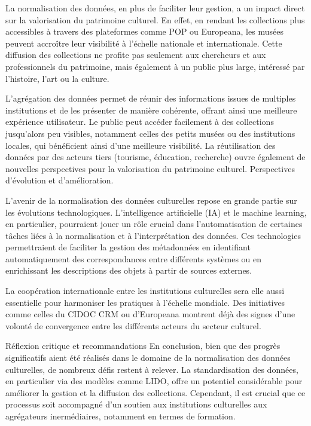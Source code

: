 La normalisation des données, en plus de faciliter leur gestion, a un impact direct sur la valorisation du patrimoine culturel. En effet, en rendant les collections plus accessibles à travers des plateformes comme POP ou Europeana, les musées peuvent accroître leur visibilité à l’échelle nationale et internationale. Cette diffusion des collections ne profite pas seulement aux chercheurs et aux professionnels du patrimoine, mais également à un public plus large, intéressé par l’histoire, l’art ou la culture. \newline

L’agrégation des données permet de réunir des informations issues de multiples institutions et de les présenter de manière cohérente, offrant ainsi une meilleure expérience utilisateur. Le public peut accéder facilement à des collections jusqu'alors peu visibles, notamment celles des petits musées ou des institutions locales, qui bénéficient ainsi d'une meilleure visibilité. La réutilisation des données par des acteurs tiers (tourisme, éducation, recherche) ouvre également de nouvelles perspectives pour la valorisation du patrimoine culturel.
Perspectives d’évolution et d’amélioration.\newline

L’avenir de la normalisation des données culturelles repose en grande partie sur les évolutions technologiques. L’intelligence artificielle (IA) et le machine learning, en particulier, pourraient jouer un rôle crucial dans l’automatisation de certaines tâches liées à la normalisation et à l’interprétation des données. Ces technologies permettraient de faciliter la gestion des métadonnées en identifiant automatiquement des correspondances entre différents systèmes ou en enrichissant les descriptions des objets à partir de sources externes.\newline

La coopération internationale entre les institutions culturelles sera elle aussi essentielle pour harmoniser les pratiques à l’échelle mondiale. Des initiatives comme celles du CIDOC CRM ou d’Europeana montrent déjà des signes d’une volonté de convergence entre les différents acteurs du secteur culturel. \newline


Réflexion critique et recommandations
En conclusion, bien que des progrès significatifs aient été réalisés dans le domaine de la normalisation des données culturelles, de nombreux défis restent à relever. La standardisation des données, en particulier via des modèles comme LIDO, offre un potentiel considérable pour améliorer la gestion et la diffusion des collections. Cependant, il est crucial que ce processus soit accompagné d’un soutien aux institutions culturelles aux agrégateurs inermédiaires, notamment en termes de formation.\newline

